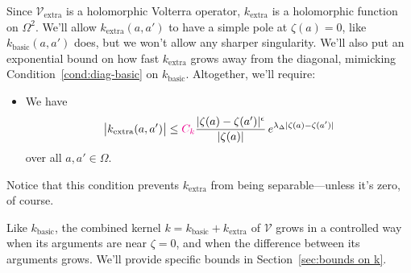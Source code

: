 \documentclass{article}
\makeatletter
\theoremstyle{plain}
\newcommand{\condconst}[2]{\item[($\text{\textsc{#1}} \mid #2$)]\protected@edef\@currentlabel{$\text{\textsc{#1}} \mid #2$}}
\newcommand{\volterra}{\mathcal{V}}
\newcommand{\softpart}{\mathcal{V}_\text{extra}}
\newcommand{\hardker}{k_\text{basic}}
\newcommand{\softker}{k_\text{extra}}
\newcommand{\domain}{\Omega}
\makeatother
\begin{document}
Since $\softpart$ is a holomorphic Volterra operator, $\softker$ is a holomorphic function on $\domain^2$. We'll allow $\softker(a, a')$ to have a simple pole at $\zeta(a) = 0$, like $\hardker(a, a')$ does, but we won't allow any sharper singularity. We'll also put an exponential bound on how fast $\softker$ grows away from the diagonal, mimicking Condition~\eqref{cond:diag-basic} on $\hardker$. Altogether, we'll require:
\begin{itemize}
\condconst{diag}{\epsilon, \lambda_\Delta}\label{cond:eps-lambda} We have
\[ \big| k_\text{extra} (a, a') \big| \leq \textcolor{magenta}{C_k}\frac{|\zeta(a)-\zeta(a')|^\epsilon}{|\zeta(a)|}\,e^{\lambda_\Delta|\zeta(a)-\zeta(a')|}\]
over all $a, a' \in \domain$.
\end{itemize}
Notice that this condition prevents $\softker$ from being separable---unless it's zero, of course.

Like $\hardker$, the combined kernel $k = \hardker + \softker$ of $\volterra$ grows in a controlled way when its arguments are near $\zeta = 0$, and when the difference between its arguments grows. We'll provide specific bounds in Section~\ref{sec:bounds on k}. 
\end{document}
